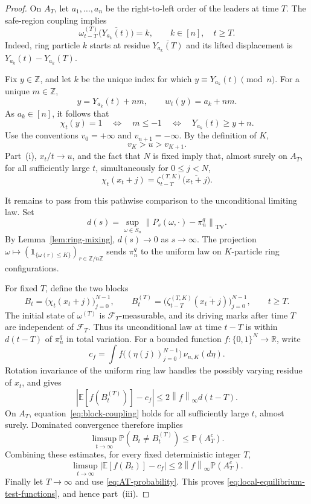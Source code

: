 \documentclass[11pt,a4paper]{amsart}
\theoremstyle{definition}
\theoremstyle{remark}
\numberwithin{equation}{section}
\newcommand{\Z}{\mathbb Z}
\newcommand{\R}{\mathbb R}
\newcommand{\Pp}{\mathbb P}
\newcommand{\Ee}{\mathbb E}
\newcommand{\one}{\mathbf 1}
\newcommand{\cF}{\mathcal F}
\newcommand{\TV}{\mathrm{TV}}
\newcommand{\norm}[1]{\left\lVert #1\right\rVert}
\newcommand{\modn}[1]{\overline{#1}}
\begin{document}
\begin{proof}
		On $A_T$, let $a_1,\ldots,a_n$ be the right-to-left order of the leaders at
		time $T$.  The safe-region coupling implies
		\begin{equation}\label{eq:ring-label-at-leader-residue}
			\omega_{t-T}^{(T)}\bigl(\modn{Y_{a_k}(t)}\bigr)=k,
			\qquad k\in[n],\quad t\ge T.
		\end{equation}
		Indeed, ring particle $k$ starts at residue
		$\modn{Y_{a_k}(T)}$ and its lifted displacement is
		$Y_{a_k}(t)-Y_{a_k}(T)$.
		
		Fix $y\in\Z$, and let $k$ be the unique index for which
		$y\equiv Y_{a_k}(t)\pmod n$.  For a unique $m\in\Z$,
		\[
		y=Y_{a_k}(t)+nm,
		\qquad
		w_t(y)=a_k+nm.
		\]
		As $a_k\in[n]$, it follows that
		\begin{equation}\label{eq:occupation-via-leader}
			\chi_t(y)=1
			\quad\Longleftrightarrow\quad
			m\le-1
			\quad\Longleftrightarrow\quad
			Y_{a_k}(t)\ge y+n.
		\end{equation}
		Use the conventions $v_0=+\infty$ and $v_{n+1}=-\infty$.  By the definition
		of $K$,
		\[
		v_K>u>v_{K+1}.
		\]
		Part~(i), $x_t/t\to u$, and the fact that $N$ is fixed imply that, almost
		surely on $A_T$, for all sufficiently large $t$, simultaneously for
		$0\le j<N$,
		\begin{equation}\label{eq:block-coupling}
			\chi_t(x_t+j)
			=\zeta_{t-T}^{(T,K)}\bigl(\modn{x_t+j}\bigr).
		\end{equation}
		
		It remains to pass from this pathwise comparison to the unconditional
		limiting law. Set
		\[
		d(s)=\sup_{\omega\in S_n}
		\norm{P_s(\omega,\cdot)-\pi_n^q}_{\TV}.
		\]
		By Lemma~\ref{lem:ring-mixing}, $d(s)\to0$ as $s\to\infty$.
		The projection $\omega\mapsto(\one_{\{\omega(r)\le K\}})_{r\in\Z/n\Z}$
		sends $\pi_n^q$ to the uniform law on $K$-particle ring configurations.
		
		For fixed $T$, define the two blocks
		\[
		B_t=\bigl(\chi_t(x_t+j)\bigr)_{j=0}^{N-1},\qquad
		B_t^{(T)}=
		\bigl(\zeta_{t-T}^{(T,K)}(\modn{x_t+j})\bigr)_{j=0}^{N-1},
		\qquad t\ge T.
		\]
		The initial state of $\omega^{(T)}$ is $\cF_T$-measurable, and its driving
		marks after time $T$ are independent of $\cF_T$. Thus its unconditional
		law at time $t-T$ is within $d(t-T)$ of $\pi_n^q$ in total variation.
		For a bounded function $f:\{0,1\}^N\to\R$, write
		\[
		c_f=\int f\bigl((\eta(j))_{j=0}^{N-1}\bigr)\,\nu_{n,K}(d\eta).
		\]
		Rotation invariance of the uniform ring law handles the possibly varying
		residue of $x_t$, and gives
		\[
		\left|\Ee[f(B_t^{(T)})]-c_f\right|
		\le 2\norm{f}_\infty d(t-T).
		\]
		On $A_T$, equation~\eqref{eq:block-coupling} holds for all sufficiently
		large $t$, almost surely. Dominated convergence therefore implies
		\[
		\limsup_{t\to\infty}\Pp(B_t\ne B_t^{(T)})\le\Pp(A_T^c).
		\]
		Combining these estimates, for every fixed deterministic integer $T$,
		\[
		\limsup_{t\to\infty}\left|\Ee[f(B_t)]-c_f\right|
		\le2\norm{f}_\infty\Pp(A_T^c).
		\]
		Finally let $T\to\infty$ and use \eqref{eq:AT-probability}. This proves
		\eqref{eq:local-equilibrium-test-functions}, and hence part~(iii).
	\end{proof}
	
\end{document}
